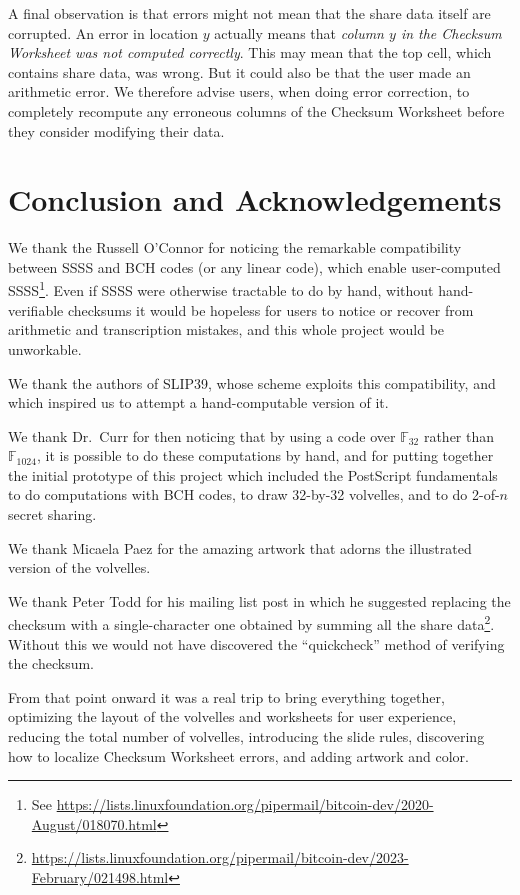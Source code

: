 \documentclass[letterpaper]{article}
\newcommand{\fttwo}{\mathbb{F}_{32}}
\begin{document}
A final observation is that errors might not mean that the share data itself are
corrupted. An error in location $y$ actually means that \emph{column $y$ in the
Checksum Worksheet was not computed correctly}. This may mean that the top cell,
which contains share data, was wrong. But it could also be that the user made an
arithmetic error. We therefore advise users, when doing error correction, to
completely recompute any erroneous columns of the Checksum Worksheet before they
consider modifying their data.

\section{Conclusion and Acknowledgements}

We thank the Russell O'Connor for noticing the remarkable compatibility between
SSSS and BCH codes (or any linear code), which enable user-computed SSSS\footnote{
See \url{https://lists.linuxfoundation.org/pipermail/bitcoin-dev/2020-August/018070.html}}.
Even if SSSS were otherwise tractable to do by hand, without hand-verifiable checksums it
would be hopeless for users to notice or recover from arithmetic and transcription
mistakes, and this whole project would be unworkable.

We thank the authors of SLIP39, whose scheme exploits this compatibility, and
which inspired us to attempt a hand-computable version of it.

We thank Dr.~Curr for then noticing that by using a code over $\fttwo$
rather than $\mathbb{F}_{1024}$, it is possible to do these computations by hand,
and for putting together the initial prototype of this project which included
the PostScript fundamentals to do computations with BCH codes, to draw 32-by-32
volvelles, and to do 2-of-$n$ secret sharing.

We thank Micaela Paez for the amazing artwork that adorns the illustrated version
of the volvelles.

We thank Peter Todd for his mailing list post in which he suggested replacing the
checksum with a single-character one obtained by summing all the share data\footnote{
\url{https://lists.linuxfoundation.org/pipermail/bitcoin-dev/2023-February/021498.html}}.
Without this we would not have discovered the ``quickcheck'' method of verifying
the checksum.

From that point onward it was a real trip to bring everything together, optimizing
the layout of the volvelles and worksheets for user experience, reducing the
total number of volvelles, introducing the slide rules, discovering how to localize
Checksum Worksheet errors, and adding artwork and color.
\end{document}
